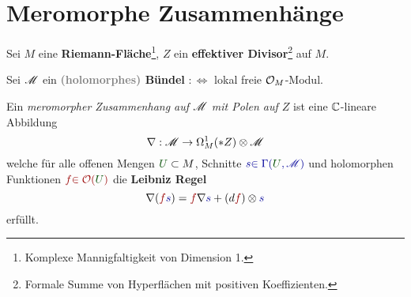 \section{Meromorphe Zusammenhänge} %
Sei $M$ eine \textbf{Riemann-Fläche}\footnote{Komplexe Mannigfaltigkeit von
Dimension 1.}, $Z$ ein \textbf{effektiver Divisor}\footnote{Formale Summe von
Hyperflächen mit positiven Koeffizienten.} auf $M$.
\begin{comment}
  Starte mit einer Diffenentialgleichung.

  Über jedem Punkt von $M\backslash Z$ hat man einen endlichen Vektorraum von
  `initial data' und erhalte ein holomorphes Bündel $\sM$ auf $M$
  \textcolor{gray}{(durch fortsetzen)}.
  \\Weiter gibt es zu jedem $x\in X$ und jedem Keim $u\in\sM_x$ in der Faser
  bei $x$ gibt es einen eindeutig bestimmten Schnitt in der Umgebung von $x$.
\end{comment}
Sei $\mathscr{M}$ ein \textbf{\textcolor{gray}{(holomorphes)} Bündel}
$:\Leftrightarrow{}$ lokal freie $\mathcal{O}_M$-Modul.
\begin{defn}
  \def\myU{\textcolor{green!30!black}{U}}
  \def\mys{\textcolor{blue!60!black}{s}}
  \def\myf{\textcolor{red!60!black}{f}}
  Ein \emph{meromorpher Zusammenhang auf $\mathscr{M}$ mit Polen auf $Z$}
  ist eine $\mathbb{C}$-lineare Abbildung
  \[
    \nabla:\mathscr{M}\to\Omega_M^1(*Z)\otimes\mathscr{M}
  \]
  welche für alle offenen Mengen $\myU\subset M$, Schnitte
  $\mys\textcolor{blue!60!black}{\in\Gamma(\myU,\sM)}$ und holomorphen
  Funktionen $\myf\textcolor{red!60!black}{\in\cO(\myU)}$ die \textbf{Leibniz
  Regel}
  \[
    \nabla(\myf\mys)=\myf\nabla\mys+(d\myf)\otimes\mys
  \]
  erfüllt.

  \begin{comment}
    \begin{defn}
      Ein Zusammenhang heißt \emph{flach} oder \emph{integrabel} falls
          seine Krümmung
      $R_\nabla:=\nabla\circ\nabla:\sM\to\Omega_M^2(*Z)\otimes_{\cO_M}\sM$
      identisch verschwindet.\marginnote{\textcolor{gray}{$R_\nabla\equiv0$}}
      \begin{rem}
        \marginnote{\tiny \cite{sabbah2007isomonodromic} Rem 0.12.5}
        Für $\dim(M)=1$ ist jeder Zusammenhang flach.
        \textcolor{gray}{Also hier nicht von Bedeutung.}
      \end{rem}
    \end{defn}
  \end{comment}
\end{defn}
